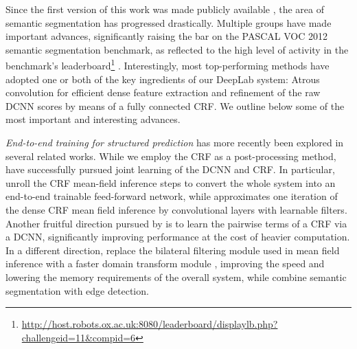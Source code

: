 Since the first version of this work was made publicly available
\cite{chen2014semantic}, the area of semantic segmentation has progressed
drastically. Multiple groups have made important advances, significantly raising
the bar on the PASCAL VOC 2012 semantic segmentation benchmark, as reflected to
the high level of activity in the benchmark's
leaderboard\footnote{\url{http://host.robots.ox.ac.uk:8080/leaderboard/displaylb.php?challengeid=11&compid=6}}
\cite{papandreou2015weakly, zheng2015conditional, dai2015boxsup, noh2015learning,
liu2015semantic, lin2015efficient, chen2015attention, chen2015semantic}.
Interestingly, most top-performing methods have adopted one or both of the key
ingredients of our DeepLab system: Atrous convolution for efficient dense
feature extraction and refinement of the raw DCNN scores by means of a fully
connected CRF. We outline below some of the most important and interesting advances.

\newcommand{\mycomment}[1]{}
\mycomment{
	A key difference compared to \cite{long2014fully} lies in the way we produce
	feature maps at the original image resolution: They use a sequence of
	deconvolutional layers \cite{zeiler2014visualizing}, while we use a combination
	of atrous convolution and bilinear interpolation, resulting in a significantly
	simpler system that explicitly handles the signal downsampling issue, requires
	fewer parameters, and is easier to train.
}


\emph{End-to-end training for structured prediction} has  more recently 
been explored in several related works. 
While we employ the CRF as a post-processing method,
\cite{zheng2015conditional, chen2014learning, schwing2015fully, liu2015semantic,
lin2015efficient} have successfully pursued joint learning of the DCNN and CRF.
In particular, \cite{zheng2015conditional, schwing2015fully} unroll the CRF
mean-field inference steps to convert the whole system into an end-to-end
trainable feed-forward network, while \cite{liu2015semantic} approximates one
iteration of the dense CRF mean field inference \cite{krahenbuhl2011efficient}
by convolutional layers with learnable filters. Another fruitful direction
pursued by \cite{lin2015efficient,chandra2016fast} is to learn the pairwise terms of a CRF
via a DCNN, significantly improving performance at the cost of heavier
computation. In a different direction, \cite{chen2015semantic} replace the
bilateral filtering module used in mean field inference with a faster
domain transform module \cite{GastalOliveira2011DomainTransform}, improving the speed and lowering the
memory requirements of the overall system, while
\cite{bertasius2015high, kokkinos2016pushing} combine semantic segmentation
with edge detection.

